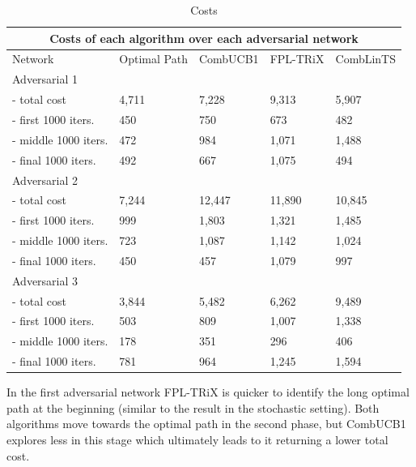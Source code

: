 \begin{table}[h]
\begin{tabular}{ |p{3.5cm}||p{2cm}|p{2cm}|p{2cm}|p{2cm}|  }
 \hline
 \multicolumn{5}{|c|}{Costs of each algorithm over each adversarial network} \\
 \hline
 Network                    & Optimal Path  & CombUCB1  & FPL-TRiX  & CombLinTS   \\
 \hline
 Adversarial 1      &               &           &           &             \\
  - total cost              & 4,711         & 7,228     & 9,313     & 5,907       \\
  - first 1000 iters.   & 450           & 750       & 673       & 482         \\
  - middle 1000 iters.  & 472           & 984       & 1,071     & 1,488       \\
  - final 1000 iters.   & 492           & 667       & 1,075     & 494         \\
 \hline
 Adversarial 2      &               &           &           &             \\
  - total cost              & 7,244         & 12,447    & 11,890    & 10,845      \\
  - first 1000 iters.   & 999           & 1,803     & 1,321     & 1,485       \\
  - middle 1000 iters.  & 723           & 1,087     & 1,142     & 1,024       \\
  - final 1000 iters.   & 450           & 457       & 1,079     & 997         \\
 \hline
 Adversarial 3      &               &           &           &             \\
  - total cost              & 3,844         & 5,482     & 6,262     & 9,489       \\
  - first 1000 iters.   & 503           & 809       & 1,007     & 1,338       \\
  - middle 1000 iters.  & 178           & 351       & 296       & 406         \\
  - final 1000 iters.   & 781           & 964       & 1,245     & 1,594       \\
 \hline
\end{tabular}
\caption{Costs}
\end{table}


In the first adversarial network FPL-TRiX is quicker to identify the long optimal path at the beginning (similar to the result in the stochastic setting). Both algorithms move towards the optimal path in the second phase, but CombUCB1 explores less in this stage which ultimately leads to it returning a lower total cost.\\

